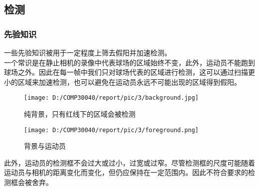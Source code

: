 \documentclass{article}
\begin{document}
\subsection{检测}
\subsubsection{先验知识}
一些先验知识被用于一定程度上筛去假阳并加速检测。\\
一个常识是在静止相机的录像中代表球场的区域始终不变，此外，运动员不能跑到球场之外。因此在每一帧中我们只对球场代表的区域进行检测，这可以通过扫描更小的区域来加速检测，也可以避免在运动员永远不可能出现的区域得到假阳。
\begin{figure}
  \centering
  \texttt{[image: D:/COMP30040/report/pic/3/background.jpg]} 
  \caption{纯背景，只有红线下的区域会被检测}
\end{figure}
\begin{figure}
  \centering
  \texttt{[image: D:/COMP30040/report/pic/3/foreground.png]} 
  \caption{背景与运动员}
\end{figure}
此外，运动员的检测框不会过大或过小，过宽或过窄。尽管检测框的尺度可能随着运动员与相机的距离变化而变化，但仍应保持在一定范围内。因此不符合要求的检测框会被舍弃。
\end{document}
